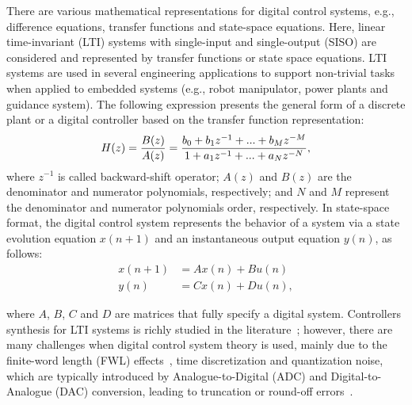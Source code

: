 \documentclass[10pt,conference]{IEEEtran}
\begin{document}


There are various mathematical representations for digital control
systems,  e.g.,  difference  equations, transfer functions and state-space
equations. Here, linear time-invariant (LTI) systems 
with single-input and single-output (SISO) are considered and 
represented by transfer functions or state space equations. LTI systems 
are used in several engineering applications to support non-trivial tasks when 
applied to embedded systems (e.g., robot manipulator, power plants 
and guidance system). The following expression presents the general form 
of a discrete plant or a digital controller based on the transfer function representation:
%
\begin{equation}
\small
\label{eq:transferfunction}
H(z)=\frac{B(z)}{A(z)}=\frac{b_{0}+b_{1}z^{-1}+...+b_{M}z^{-M}}{1+a_{1}z^{-1}+...+a_{N}z^{-N}},
\end{equation}
%
\noindent where $z^{-1}$ is called backward-shift operator; $A(z)$ and $B(z)$ are 
the denominator and numerator polynomials, respectively; and $N$ and $M$
represent the denominator and numerator polynomials order, respectively.
%
In state-space format, the digital control system represents the behavior 
of a system via a state evolution equation $x(n+1)$ and an instantaneous 
output equation $y(n)$, as follows:
%
\begin{equation}
\begin{split}
x(n+1) &= A x(n) + B u(n)
\\
y(n) &= C x(n) + D u(n), 
\end{split}\label{eq:ss-example}
\end{equation}

\noindent where $A$, $B$, $C$ and $D$ are matrices that fully specify a digital system. 
%
Controllers synthesis for LTI systems is richly studied 
in the literature~\cite{mazo2010pessoa,DBLP:conf/emsoft/RavanbakhshS16,economakos2016automated}; 
however, there are many challenges when 
digital control system theory is used, mainly due to the finite-word 
length (FWL) effects~\cite{Guang2013, Istepanian2001}, time discretization 
and quantization noise, which are typically introduced by Analogue-to-Digital 
(ADC) and Digital-to-Analogue (DAC) conversion, leading to truncation 
or round-off errors~\cite{astrom1997computer}. 
\end{document}
